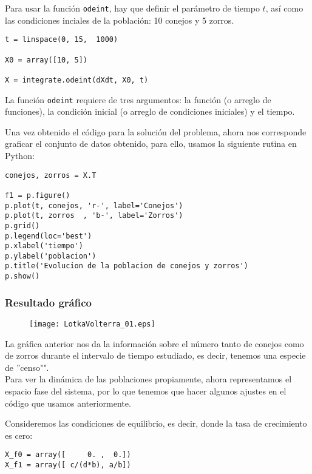 \begin{frame}[fragile]
Para usar la funci\'{o}n \texttt{odeint}, hay que definir el par\'{a}metro de tiempo $t$, as\'{i} como las condiciones inciales de la poblaci\'{o}n: 10 conejos y 5 zorros.
\begin{lstlisting}
t = linspace(0, 15,  1000)
              
X0 = array([10, 5])         
            
X = integrate.odeint(dXdt, X0, t)
\end{lstlisting}
La funci\'{o}n \texttt{odeint} requiere de tres argumentos: la funci\'{o}n (o arreglo de funciones), la condici\'{o}n inicial (o arreglo de condiciones iniciales) y el tiempo.
\end{frame}
\begin{frame}[fragile]
Una vez obtenido el c\'{o}digo para la soluci\'{o}n del problema, ahora nos corresponde graficar el conjunto de datos obtenido, para ello, usamos la siguiente rutina en Python:
\begin{lstlisting}
conejos, zorros = X.T

f1 = p.figure()
p.plot(t, conejos, 'r-', label='Conejos')
p.plot(t, zorros  , 'b-', label='Zorros')
p.grid()
p.legend(loc='best')
p.xlabel('tiempo')
p.ylabel('poblacion')
p.title('Evolucion de la poblacion de conejos y zorros')
p.show()
\end{lstlisting}
\end{frame}
\begin{frame}
\frametitle{Resultado gr\'{a}fico}
\begin{figure}
	\centering
	\texttt{[image: LotkaVolterra\_01.eps]} 
\end{figure}
\end{frame}
\begin{frame}
La gr\'{a}fica anterior nos da la informaci\'{o}n sobre el n\'{u}mero tanto de conejos como de zorros durante el intervalo de tiempo estudiado, es decir, tenemos una especie de ''censo"".
\\
\medskip
Para ver la din\'{a}mica de las poblaciones propiamente, ahora representamos el espacio fase del sistema, por lo que tenemos que hacer algunos ajustes en el c\'{o}digo que usamos anteriormente.
\end{frame}
\begin{frame}[fragile]
Consideremos las condiciones de equilibrio, es decir, donde la tasa de crecimiento es cero:
\begin{lstlisting}
X_f0 = array([     0. ,  0.])
X_f1 = array([ c/(d*b), a/b])
\end{lstlisting}
\end{frame}
